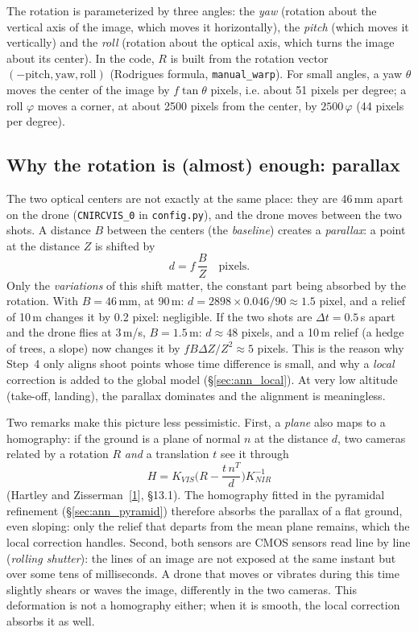 \documentclass[a4paper,11pt]{report}
\begin{document}
The rotation is parameterized by three angles: the \emph{yaw} (rotation about the vertical axis of the image, which moves it horizontally), the \emph{pitch} (which moves it vertically) and the \emph{roll} (rotation about the optical axis, which turns the image about its center). In the code, $R$ is built from the rotation vector $(-\text{pitch}, \text{yaw}, \text{roll})$ (Rodrigues formula, \texttt{manual\_warp}). For small angles, a yaw $\theta$ moves the center of the image by $f \tan\theta$ pixels, i.e. about 51 pixels per degree; a roll $\varphi$ moves a corner, at about 2500 pixels from the center, by $2500\,\varphi$ (44 pixels per degree).

\subsection{Why the rotation is (almost) enough: parallax}
The two optical centers are not exactly at the same place: they are 46\,mm apart on the drone (\texttt{CNIRCVIS\_0} in \texttt{config.py}), and the drone moves between the two shots. A distance $B$ between the centers (the \emph{baseline}) creates a \emph{parallax}: a point at the distance $Z$ is shifted by
\begin{equation}
	d = f\,\frac{B}{Z} \quad \text{pixels}.
\end{equation}
Only the \emph{variations} of this shift matter, the constant part being absorbed by the rotation. With $B = 46$\,mm, at 90\,m: $d = 2898 \times 0.046 / 90 \approx 1.5$ pixel, and a relief of 10\,m changes it by 0.2 pixel: negligible. If the two shots are $\Delta t = 0.5$\,s apart and the drone flies at 3\,m/s, $B = 1.5$\,m: $d \approx 48$ pixels, and a 10\,m relief (a hedge of trees, a slope) now changes it by $f B \Delta Z / Z^2 \approx 5$ pixels. This is the reason why Step~4 only aligns shoot points whose time difference is small, and why a \emph{local} correction is added to the global model (\S\ref{sec:ann_local}). At very low altitude (take-off, landing), the parallax dominates and the alignment is meaningless.

Two remarks make this picture less pessimistic. First, a \emph{plane} also maps to a homography: if the ground is a plane of normal $n$ at the distance $d$, two cameras related by a rotation $R$ \emph{and} a translation $t$ see it through
\begin{equation}\label{eq:ann_plane_homography}
	H = K_{VIS} \Big( R - \frac{t\, n^T}{d} \Big) K_{NIR}^{-1}
\end{equation}
(Hartley and Zisserman~[\hyperref[ann_hz]{1}], \S13.1). The homography fitted in the pyramidal refinement (\S\ref{sec:ann_pyramid}) therefore absorbs the parallax of a flat ground, even sloping: only the relief that departs from the mean plane remains, which the local correction handles. Second, both sensors are CMOS sensors read line by line (\emph{rolling shutter}): the lines of an image are not exposed at the same instant but over some tens of milliseconds. A drone that moves or vibrates during this time slightly shears or waves the image, differently in the two cameras. This deformation is not a homography either; when it is smooth, the local correction absorbs it as well.
\end{document}
